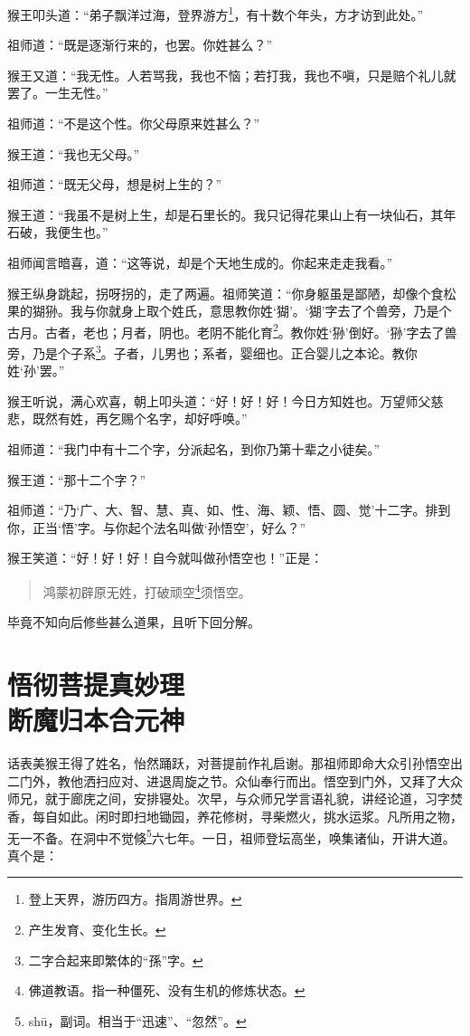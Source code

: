 \documentclass[12pt,UTF8]{ctexbook}
\begin{document}
猴王叩头道：“弟子飘洋过海，登界游方\footnote{登上天界，游历四方。指周游世界。}，有十数个年头，方才访到此处。”

祖师道：“既是逐渐行来的，也罢。你姓甚么？”

猴王又道：“我无性。人若骂我，我也不恼；若打我，我也不嗔，只是赔个礼儿就罢了。一生无性。”

祖师道：“不是这个性。你父母原来姓甚么？”

猴王道：“我也无父母。”

祖师道：“既无父母，想是树上生的？”

猴王道：“我虽不是树上生，却是石里长的。我只记得花果山上有一块仙石，其年石破，我便生也。”

祖师闻言暗喜，道：“这等说，却是个天地生成的。你起来走走我看。”

猴王纵身跳起，拐呀拐的，走了两遍。祖师笑道：“你身躯虽是鄙陋，却像个食松果的猢狲。我与你就身上取个姓氏，意思教你姓‘猢’。‘猢’字去了个兽旁，乃是个古月。古者，老也；月者，阴也。老阴不能化育\footnote{产生发育、变化生长。}。教你姓‘狲’倒好。‘狲’字去了兽旁，乃是个子系\footnote{二字合起来即繁体的“孫”字。}。子者，儿男也；系者，婴细也。正合婴儿之本论。教你姓‘孙’罢。”

猴王听说，满心欢喜，朝上叩头道：“好！好！好！今日方知姓也。万望师父慈悲，既然有姓，再乞赐个名字，却好呼唤。”

祖师道：“我门中有十二个字，分派起名，到你乃第十辈之小徒矣。”

猴王道：“那十二个字？”

祖师道：“乃‘广、大、智、慧、真、如、性、海、颖、悟、圆、觉’十二字。排到你，正当‘悟’字。与你起个法名叫做‘孙悟空’，好么？”

猴王笑道：“好！好！好！自今就叫做孙悟空也！”正是：

\begin{quotation}
鸿蒙初辟原无姓，打破顽空\footnote{佛道教语。指一种僵死、没有生机的修炼状态。}须悟空。
\end{quotation}

毕竟不知向后修些甚么道果，且听下回分解。

\chapter[悟彻菩提真妙理\ 断魔归本合元神]{悟彻菩提真妙理\\断魔归本合元神}

话表美猴王得了姓名，怡然踊跃，对菩提前作礼启谢。那祖师即命大众引孙悟空出二门外，教他洒扫应对、进退周旋之节。众仙奉行而出。悟空到门外，又拜了大众师兄，就于廊庑之间，安排寝处。次早，与众师兄学言语礼貌，讲经论道，习字焚香，每自如此。闲时即扫地锄园，养花修树，寻柴燃火，挑水运浆。凡所用之物，无一不备。在洞中不觉倏\footnote{sh\=u，副词。相当于“迅速”、“忽然”。}六七年。一日，祖师登坛高坐，唤集诸仙，开讲大道。真个是：
\end{document}
